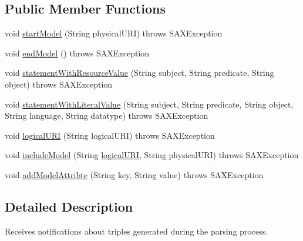 \subsection*{Public Member Functions}
\begin{DoxyCompactItemize}
\item 
void \hyperlink{interfaceorg_1_1semanticweb_1_1owlapi_1_1rdf_1_1syntax_1_1_r_d_f_consumer_a5012a4c1293cd4f1c0b5385882853eae}{start\-Model} (String physical\-U\-R\-I)  throws S\-A\-X\-Exception
\item 
void \hyperlink{interfaceorg_1_1semanticweb_1_1owlapi_1_1rdf_1_1syntax_1_1_r_d_f_consumer_a4b1f9b8dfe0b670fab7bb9feed16ea07}{end\-Model} ()  throws S\-A\-X\-Exception
\item 
void \hyperlink{interfaceorg_1_1semanticweb_1_1owlapi_1_1rdf_1_1syntax_1_1_r_d_f_consumer_ada116a7d32435d2a72e4a7a6f47c6ead}{statement\-With\-Resource\-Value} (String subject, String predicate, String object)  throws S\-A\-X\-Exception
\item 
void \hyperlink{interfaceorg_1_1semanticweb_1_1owlapi_1_1rdf_1_1syntax_1_1_r_d_f_consumer_a7f6dc8d96007334dde8e651b631cdaf4}{statement\-With\-Literal\-Value} (String subject, String predicate, String object, String language, String datatype)  throws S\-A\-X\-Exception
\item 
void \hyperlink{interfaceorg_1_1semanticweb_1_1owlapi_1_1rdf_1_1syntax_1_1_r_d_f_consumer_aee6f242600e8c6f4a98193e8cf504dae}{logical\-U\-R\-I} (String logical\-U\-R\-I)  throws S\-A\-X\-Exception
\item 
void \hyperlink{interfaceorg_1_1semanticweb_1_1owlapi_1_1rdf_1_1syntax_1_1_r_d_f_consumer_ac184121f063662eca9cc6cc4ac865532}{include\-Model} (String \hyperlink{interfaceorg_1_1semanticweb_1_1owlapi_1_1rdf_1_1syntax_1_1_r_d_f_consumer_aee6f242600e8c6f4a98193e8cf504dae}{logical\-U\-R\-I}, String physical\-U\-R\-I)  throws S\-A\-X\-Exception
\item 
void \hyperlink{interfaceorg_1_1semanticweb_1_1owlapi_1_1rdf_1_1syntax_1_1_r_d_f_consumer_ae31dd7fb89f7fe9190a8877e7cb5ef55}{add\-Model\-Attribte} (String key, String value)  throws S\-A\-X\-Exception
\end{DoxyCompactItemize}


\subsection{Detailed Description}
Receives notifications about triples generated during the parsing process. 

